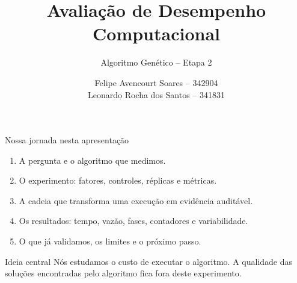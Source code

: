 \documentclass[aspectratio=169,11pt]{beamer}
\title{Avaliação de Desempenho Computacional}
\subtitle{Algoritmo Genético -- Etapa 2}
\author{Felipe Avencourt Soares -- 342904\\[0.20cm]Leonardo Rocha dos Santos -- 341831}
\institute{Instituto de Informática -- UFRGS 2026/2}
\date{}
\begin{document}
{%
%
\begin{frame}
    \vfill
    \begin{center}
        \begin{tcolorbox}[enhanced,width=0.92\textwidth,colback=mainblue,colframe=mainblue,arc=2mm,boxrule=0pt,left=3mm,right=3mm,top=5mm,bottom=5mm,drop shadow={shadow xshift=1.7mm,shadow yshift=-1.7mm,opacity=0.35}]
            \centering
            {\color{white}\LARGE\inserttitle\par}
            \vspace{0.15cm}
            {\color{white}\Large\insertsubtitle}
        \end{tcolorbox}
        \vspace{0.75cm}
        {\large\insertauthor\par}
        \vspace{0.35cm}
        {\small\insertinstitute\par}
    \end{center}
    \vfill
\end{frame}
}

\begin{frame}{Nossa jornada nesta apresentação}
    \begin{enumerate}
        \item A pergunta e o algoritmo que medimos.
        \item O experimento: fatores, controles, réplicas e métricas.
        \item A cadeia que transforma uma execução em evidência auditável.
        \item Os resultados: tempo, vazão, fases, contadores e variabilidade.
        \item O que já validamos, os limites e o próximo passo.
    \end{enumerate}
    \vspace{0.32cm}
    \begin{questionbox}{Ideia central}
        Nós estudamos o custo de executar o algoritmo. A qualidade das soluções
        encontradas pelo algoritmo fica fora deste experimento.
    \end{questionbox}
\end{frame}
\end{document}
